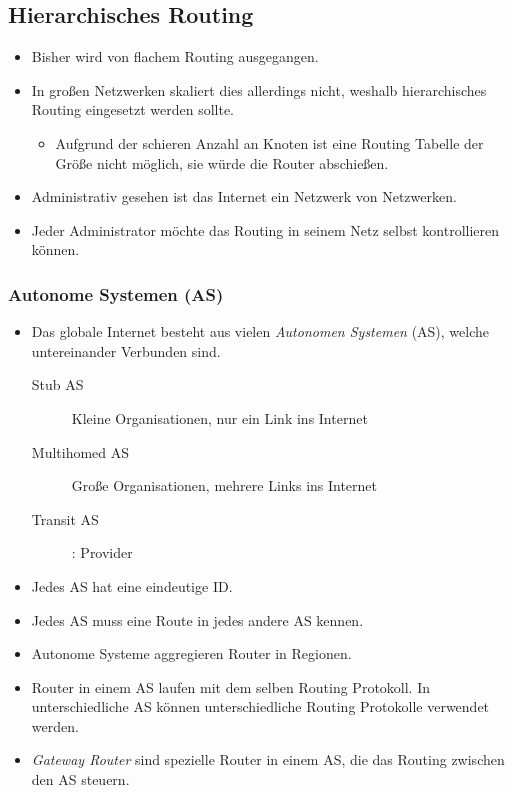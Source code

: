 \documentclass[a4paper, 11pt, accentcolor = tud3b]{tudreport}
\begin{document}
            \subsection{Hierarchisches Routing}
                \begin{itemize}
                	\item Bisher wird von flachem Routing ausgegangen.
                	\item In großen Netzwerken skaliert dies allerdings nicht, weshalb hierarchisches Routing eingesetzt werden sollte.
	                	\begin{itemize}
	                		\item Aufgrund der schieren Anzahl an Knoten ist eine Routing Tabelle der Größe nicht möglich, sie würde die Router abschießen.
	                	\end{itemize}
	                \item Administrativ gesehen ist das Internet ein Netzwerk von Netzwerken.
	                \item Jeder Administrator möchte das Routing in seinem Netz selbst kontrollieren können.
                \end{itemize}

                \subsubsection{Autonome Systemen (AS)}
                    \begin{itemize}
                    	\item Das globale Internet besteht aus vielen \textit{Autonomen Systemen} (AS), welche untereinander Verbunden sind.
	                    	\begin{description}
	                    		\item[Stub AS] Kleine Organisationen, nur ein Link ins Internet
	                    		\item[Multihomed AS] Große Organisationen, mehrere Links ins Internet
	                    		\item[Transit AS]: Provider
	                    	\end{description}
	                    \item Jedes AS hat eine eindeutige ID.
	                    \item Jedes AS muss eine Route in jedes andere AS kennen.
	                    \item Autonome Systeme aggregieren Router in Regionen.
	                    \item Router in einem AS laufen mit dem selben Routing Protokoll. In unterschiedliche AS können unterschiedliche Routing Protokolle verwendet werden.
	                    \item \textit{Gateway Router} sind spezielle Router in einem AS, die das Routing zwischen den AS steuern.
                    \end{itemize}
\end{document}
